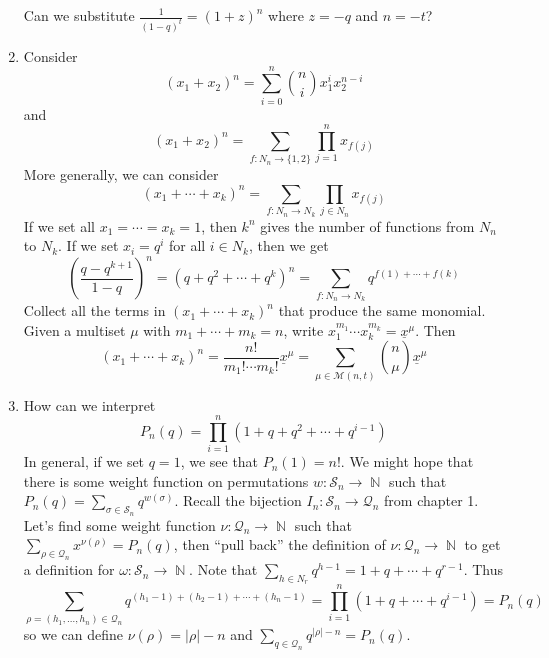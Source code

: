 \documentclass[11pt, a4paper]{memoir}
\DeclareMathOperator{\N}{{\mathbb{N}}}
\theoremstyle{change}
\theoremstyle{plain}
\theoremstyle{nonumberplain}
\numberwithin{equation}{section}
\begin{document}
\begin{enumerate}
        Can we substitute $\frac{1}{(1-q)^t}=(1+z)^n$ where $z=-q$ and $n=-t$?
    \item Consider
        \begin{equation*}
            (x_1+x_2)^n = \sum_{i=0}^n\binom{n}{i}x_1^ix_2^{n-i}
        \end{equation*}
        and
        \begin{equation*}
            (x_1+x_2)^n = \sum_{f:N_n\to\{1,2\}}\prod_{j=1}^n x_{f(j)}
        \end{equation*}
        More generally, we can consider
        \begin{equation*}
            (x_1+\cdots+x_k)^n = \sum_{f:N_n\to N_k}\prod_{j\in N_n}x_{f(j)}
        \end{equation*}
        If we set all $x_1=\cdots=x_k=1$, then $k^n$ gives the number of functions from $N_n$ to $N_k$.
        If we set $x_i=q^i$ for all $i\in N_k$, then we get
        \begin{equation*}
            \left(\frac{q-q^{k+1}}{1-q}\right)^n =(q+q^2+\cdots+q^k)^n = \sum_{f:N_n\to N_k}q^{f(1)+\cdots+f(k)}
        \end{equation*}
        Collect all the terms in $(x_1+\cdots+x_k)^n$ that produce the same monomial.
        Given a multiset $\mu$ with $m_1+\cdots+m_k=n$, write $x_1^{m_1}\cdots x_k^{m_k}=\underline{x}^\mu$.
        Then
        \begin{equation*}
            (x_1+\cdots+x_k)^n =\frac{n!}{m_1!\cdots m_k!}\underline{x}^\mu= \sum_{\mu\in \mathcal{M}(n,t)}\binom{n}{\mu}\underline{x}^\mu
        \end{equation*}

    \item How can we interpret
        \begin{equation*}
            P_n(q)=\prod_{i=1}^n(1+q+q^2+\cdots+q^{i-1})
        \end{equation*}
        In general, if we set $q=1$, we see that $P_n(1)=n!$.
        We might hope that there is some weight function on permutations $w:\mathcal{S}_n\to\N$ such that $P_n(q)=\sum_{\sigma\in\mathcal{S}_n}q^{w(\sigma)}$.
        Recall the bijection $I_n:\mathcal{S}_n\to\mathcal{Q}_n$ from chapter 1.
        Let's find some weight function $\nu:\mathcal{Q}_n\to\N$ such that $\sum_{\rho\in\mathcal{Q}_n}x^{\nu(\rho)}=P_n(q)$, then ``pull back'' the definition of $\nu:\mathcal{Q}_n\to\N$ to get a definition for $\omega:\mathcal{S}_n\to\N$.
        Note that $\sum_{h\in N_r}q^{h-1}=1+q+\cdots+q^{r-1}$.
        Thus
        \begin{equation*}
            \sum_{\rho=(h_1,\ldots,h_n)\in\mathcal{Q}_n}q^{(h_1-1)+(h_2-1)+\cdots+(h_n-1)} = \prod_{i=1}^n(1+q+\cdots+q^{i-1})=P_n(q)
        \end{equation*}
        so we can define $\nu(\rho)=|\rho|-n$ and $\sum_{q\in\mathcal{Q}_n}q^{|\rho|-n}=P_n(q)$.
\end{enumerate}
\end{document}
